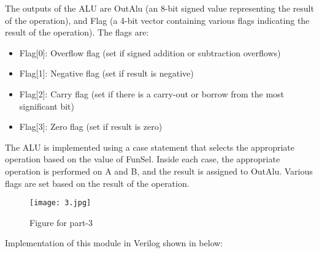 \documentclass[12pt]{article}
\begin{document}
\begin{itemize}
The outputs of the ALU are OutAlu (an 8-bit signed value representing the result of the operation), and Flag (a 4-bit vector containing various flags indicating the result of the operation). The flags are:
   \begin{itemize}
   \item Flag[0]: Overflow flag (set if signed addition or subtraction overflows)
   \item Flag[1]: Negative flag (set if result is negative)
   \item Flag[2]: Carry flag (set if there is a carry-out or borrow from the most significant bit)
   \item Flag[3]: Zero flag (set if result is zero)
   \end{itemize}
   The ALU is implemented using a case statement that selects the appropriate operation based on the value of FunSel. Inside each case, the appropriate operation is performed on A and B, and the result is assigned to OutAlu. Various flags are set based on the result of the operation.
\end{itemize}   

\begin{figure}[H]
    \centering
    \texttt{[image: 3.jpg]}
    \caption{Figure for part-3}
    \label{fig:part3}
\end{figure}

\vspace{1cm}
Implementation of this module in Verilog shown in below:
 
\end{document}
